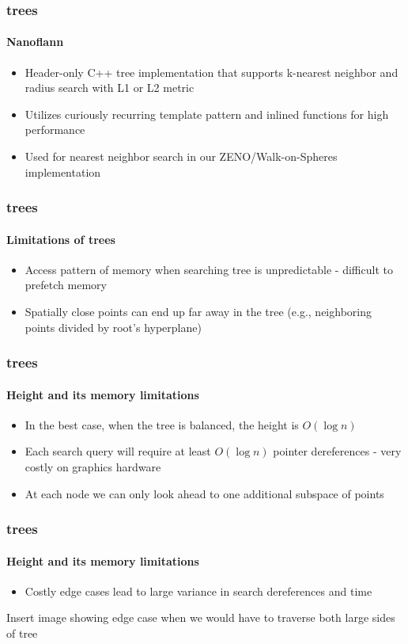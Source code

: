 \begin{frame}
  \frametitle{\kd trees}
  \framesubtitle{Nanoflann}

  \begin{itemize}
    \item Header-only C++ \kd tree implementation that supports k-nearest neighbor and radius search with 
      L1 or L2 metric
    \item Utilizes curiously recurring template pattern and inlined functions for high performance
    \item Used for nearest neighbor search in our ZENO/Walk-on-Spheres implementation 
  \end{itemize}

\end{frame}


\begin{frame}
  \frametitle{\kd trees}
  \framesubtitle{Limitations of trees}

  \begin{itemize}
    \item Access pattern of memory when searching tree is unpredictable - difficult to prefetch memory
    \item Spatially close points can end up far away in the tree (e.g., neighboring points divided by 
      root's hyperplane)
  \end{itemize}
\end{frame}

\begin{frame}
  \frametitle{\kd trees}
  \framesubtitle{Height and its memory limitations}

  \begin{itemize}
    \item In the best case, when the tree is balanced, the height is $O(\log n)$
    \item Each search query will require at least $O(\log n )$ pointer dereferences - very costly on graphics 
      hardware
    \item At each node we can only look ahead to one additional subspace of points
  \end{itemize}
\end{frame}

\begin{frame}
  \frametitle{\kd trees}
  \framesubtitle{Height and its memory limitations}

  \begin{itemize}
    \item Costly edge cases lead to large variance in search dereferences and time
  \end{itemize}

  Insert image showing edge case when we would have to traverse both large sides of tree
\end{frame}
